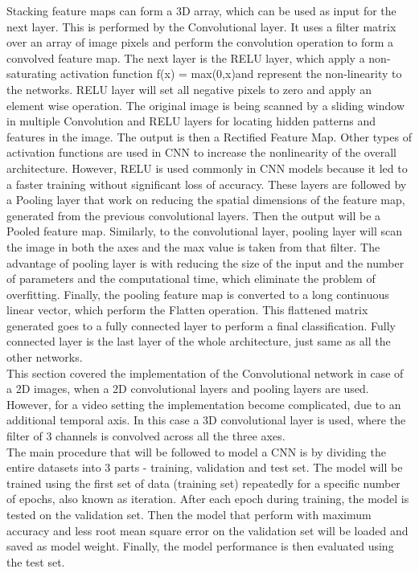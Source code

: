 Stacking feature maps can form a 3D array, which can be used as input for the next layer. This is performed by the Convolutional layer. It uses a filter matrix over an array of image pixels and perform the convolution operation to form a convolved feature map. The next layer is the RELU layer, which apply a non-saturating activation function f(x) = max(0,x)and represent the non-linearity to the networks. RELU layer will set all negative pixels to zero and apply an element wise operation. The original image is being scanned by a sliding window in multiple Convolution and RELU layers for locating hidden patterns and features in the image. The output is then a Rectified Feature Map. Other types of activation functions are used in CNN to increase the nonlinearity of the overall architecture. However, RELU is used commonly in CNN models because it led to a faster training without significant loss of accuracy. These layers are followed by a Pooling layer that work on reducing the spatial dimensions of the feature map, generated from the previous convolutional layers. Then the output will be a Pooled feature map. Similarly, to the convolutional layer, pooling layer will scan the image in both the axes and the max value is taken from that filter. The advantage of pooling layer is with reducing the size of the input and the number of parameters and the computational time, which eliminate the problem of overfitting. Finally, the pooling feature map is converted to a long continuous linear vector, which perform the Flatten operation. This flattened matrix generated goes to a fully connected layer to perform a final classification. Fully connected layer is the last layer of the whole architecture, just same as all the other networks.\\

This section covered the implementation of the Convolutional network in case of a 2D images, when a 2D convolutional layers and pooling layers are used. However, for a video setting the implementation become complicated, due to an additional temporal axis. In this case a 3D convolutional layer is used, where the filter of 3 channels is convolved across all the three axes.\\

The main procedure that will be followed to model a CNN is by dividing the entire datasets into 3 parts - training, validation and test set. The model will be trained using the first set of data (training set) repeatedly for a specific number of epochs, also known as iteration. After each epoch during training, the model is tested on the validation set. Then the model that perform with maximum accuracy and less root mean square error on the validation set will be loaded and saved as model weight. Finally, the model performance is then evaluated using the test set.

